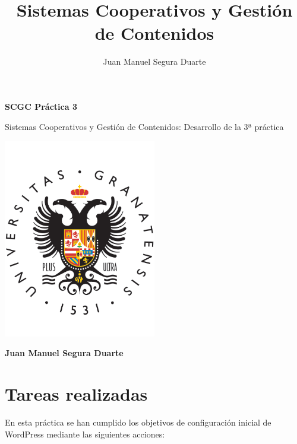\documentclass[a4paper]{article}
\title{Sistemas Cooperativos y Gestión de Contenidos}
\author{Juan Manuel Segura Duarte}
\begin{document}
\begin{titlepage}
    \centering
    \vspace*{3cm}  %
    {\Huge \textbf{SCGC Práctica 3}} %
    \vspace{1cm}
    
    {\Large Sistemas Cooperativos y Gestión de Contenidos: Desarrollo de la 3ª práctica} %
    
    \includegraphics[width=0.5\textwidth]{images/ugr-logo.png}
    \vspace{1cm}
    
    \textbf{\Large Juan Manuel Segura Duarte} %
\end{titlepage}
\newpage

\thispagestyle{empty}
\tableofcontents


\newpage
{}
\setcounter{page}{1}

\section{Tareas realizadas}

En esta práctica se han cumplido los objetivos de configuración inicial de WordPress mediante las siguientes acciones:
\end{document}
